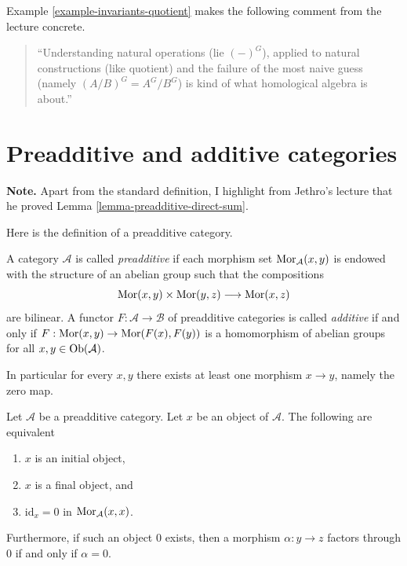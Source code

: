 \noindent
Example \ref{example-invariants-quotient}
makes the following comment from the
lecture concrete.

\begin{quote}
``Understanding natural operations
(lie $(-)^G$), applied to natural
constructions
(like quotient)
and the failure of the most naive
guess (namely $(A/B)^G=A^G/B^G$)
is kind of what homological algebra
is about.''
\end{quote}

\section{Preadditive and additive categories}
\label{section-additive-categories}

\noindent
{\bf Note.} Apart from the standard
definition, I highlight from Jethro's
lecture that he proved 
Lemma \ref{lemma-preadditive-direct-sum}.


\medskip\noindent
Here is the definition of a preadditive
category.

\begin{definition}
\label{definition-preadditive}
A category $\mathcal{A}$ is called {\it
preadditive} if each
morphism set $\mathop{\mathrm{Mor}}\nolimits_\mathcal{A}(x, y)$ is
endowed
with the structure of an abelian group such
that the
compositions
$$
\mathop{\mathrm{Mor}}\nolimits(x, y) \times \mathop{\mathrm{Mor}}\nolimits(y, z)
\longrightarrow
\mathop{\mathrm{Mor}}\nolimits(x, z)
$$
are bilinear. A functor $F : \mathcal{A} \to
\mathcal{B}$ of
preadditive categories is called {\it
additive} if and only
if $F : \mathop{\mathrm{Mor}}\nolimits(x, y) \to \mathop{\mathrm{Mor}}\nolimits(F(x), F(y))$
is a homomorphism of abelian groups for all
$x, y \in \mathop{\mathrm{Ob}}\nolimits(\mathcal{A})$.
\end{definition}

\noindent
In particular for every $x, y$ there exists
at least
one morphism $x \to y$, namely the zero map.

\begin{lemma}
\label{lemma-preadditive-zero}
Let $\mathcal{A}$ be a preadditive category.
Let $x$ be an object of $\mathcal{A}$.
The following are equivalent
\begin{enumerate}
\item $x$ is an initial object,
\item $x$ is a final object, and
\item $\text{id}_x = 0$ in
$\mathop{\mathrm{Mor}}\nolimits_\mathcal{A}(x, x)$.
\end{enumerate}
Furthermore, if such an object $0$ exists,
then a morphism
$\alpha : y \to z$ factors through $0$ if and
only if $\alpha = 0$.
\end{lemma}


